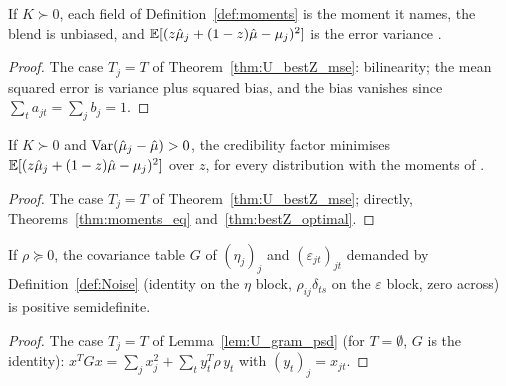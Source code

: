 \begin{theorem}\label{thm:moments_eq}
  \leanok
  If $K \succ 0$, each field of Definition~\ref{def:moments} is the moment it
  names, the blend is unbiased, and
  $\mathbb E[(z\hat\mu_j + (1-z)\hat\mu - \mu_j)^2]$ is the error variance
  .
\end{theorem}
\begin{proof}
  \leanok
  The case $T_j = T$ of Theorem~\ref{thm:U_bestZ_mse}: bilinearity; the mean
  squared error is variance plus squared bias, and the bias vanishes since
  $\sum_t a_{jt} = \sum_j b_j = 1$.
\end{proof}

\begin{theorem}\label{thm:bestZ_mse}
  \leanok
  If $K \succ 0$ and $\operatorname{Var}(\hat\mu_j - \hat\mu) > 0$, the credibility factor
   minimises $\mathbb E[(z\hat\mu_j + (1-z)\hat\mu - \mu_j)^2]$ over $z$,
  for every distribution with the moments of .
\end{theorem}
\begin{proof}
  \leanok
  The case $T_j = T$ of Theorem~\ref{thm:U_bestZ_mse}; directly,
  Theorems~\ref{thm:moments_eq} and~\ref{thm:bestZ_optimal}.
\end{proof}

\begin{lemma}\label{lem:gram_psd}
  \leanok
  If $\rho \succeq 0$, the covariance table $G$ of $(\eta_j)_j$ and
  $(\varepsilon_{jt})_{jt}$ demanded by Definition~\ref{def:Noise}
  (identity on the $\eta$ block, $\rho_{ij}\delta_{ts}$ on the $\varepsilon$
  block, zero across) is positive semidefinite.
\end{lemma}
\begin{proof}
  \leanok
  The case $T_j = T$ of Lemma~\ref{lem:U_gram_psd} (for $T = \emptyset$,
  $G$ is the identity): $x^TGx = \sum_j x_j^2 + \sum_t y_t^T\rho\,y_t$ with
  $(y_t)_j = x_{jt}$.
\end{proof}


